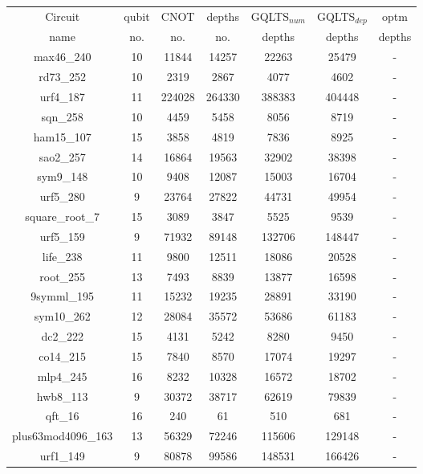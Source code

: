 \documentclass[runningheads]{llncs}
\begin{document}
								\begin{table}[H]
									\begin{center}  
									\begin{tabular}{|c|c|c|c|c|c|c|}
									\hline
									Circuit &  qubit  & CNOT &depths &GQLTS$_{num}$& GQLTS$_{dep}$  & optm 	  	\\
									 name	&   no. 	&	no. & no. & depths&  depths &  depths 	\\
									\hline
									max46\_240 & 10 & 11844 & 14257 & 22263 & 25479 & - \\
									rd73\_252 & 10 & 2319 & 2867 & 4077 & 4602 & - \\
									urf4\_187 & 11 & 224028 & 264330 & 388383 & 404448 & - \\
									sqn\_258 & 10 & 4459 & 5458 & 8056 & 8719 & - \\
									ham15\_107 & 15 & 3858 & 4819 & 7836 & 8925 & - \\
									sao2\_257 & 14 & 16864 & 19563 & 32902 & 38398 & - \\
									sym9\_148 & 10 & 9408 & 12087 & 15003 & 16704 & - \\
									urf5\_280 & 9 & 23764 & 27822 & 44731 & 49954 & - \\
									square\_root\_7 & 15 & 3089 & 3847 & 5525 & 9539 & - \\
									urf5\_159 & 9 & 71932 & 89148 & 132706 & 148447 & - \\
									life\_238 & 11 & 9800 & 12511 & 18086 & 20528 & - \\
									root\_255 & 13 & 7493 & 8839 & 13877 & 16598 & - \\
									9symml\_195 & 11 & 15232 & 19235 & 28891 & 33190 & - \\
									sym10\_262 & 12 & 28084 & 35572 & 53686 & 61183 & - \\
									dc2\_222 & 15 & 4131 & 5242 & 8280 & 9450 & - \\
									co14\_215 & 15 & 7840 & 8570 & 17074 & 19297 & - \\
									mlp4\_245 & 16 & 8232 & 10328 & 16572 & 18702 & - \\
									hwb8\_113 & 9 & 30372 & 38717 & 62619 & 79839 & - \\
									qft\_16 & 16 & 240 & 61 & 510 & 681 & - \\
									plus63mod4096\_163 & 13 & 56329 & 72246 & 115606 & 129148 & - \\
									urf1\_149 & 9 & 80878 & 99586 & 148531 & 166426 & - \\

\end{tabular}
\end{center}
\end{table}
\end{document}

